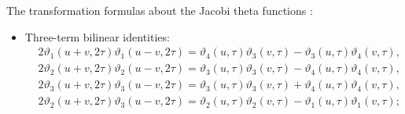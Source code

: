 \documentclass[11pt,reqno]{amsart}
\numberwithin{equation}{section}
\begin{document}
The transformation formulas about the Jacobi theta functions \cite{Kharchev-2015-theta}:
\begin{itemize}
	\item Three-term bilinear identities:
	\begin{equation}\label{eq:formula-theta-2tau-1}
		\begin{split}
			&2\vartheta_1(u+v,2\tau)\vartheta_1(u-v,2\tau)= \vartheta_4(u,\tau)\vartheta_3(v,\tau)-\vartheta_3(u,\tau)\vartheta_4(v,\tau),\\
			&2\vartheta_2(u+v,2\tau)\vartheta_2(u-v,2\tau)= \vartheta_3(u,\tau)\vartheta_3(v,\tau)-\vartheta_4(u,\tau)\vartheta_4(v,\tau),\\
			&2\vartheta_3(u+v,2\tau)\vartheta_3(u-v,2\tau)= \vartheta_3(u,\tau)\vartheta_3(v,\tau)+\vartheta_4(u,\tau)\vartheta_4(v,\tau),\\
			&2\vartheta_2(u+v,2\tau)\vartheta_3(u-v,2\tau)= \vartheta_2(u,\tau)\vartheta_2(v,\tau)-\vartheta_1(u,\tau)\vartheta_1(v,\tau);
		\end{split}
	\end{equation}
	
	

\end{itemize}
\end{document}
